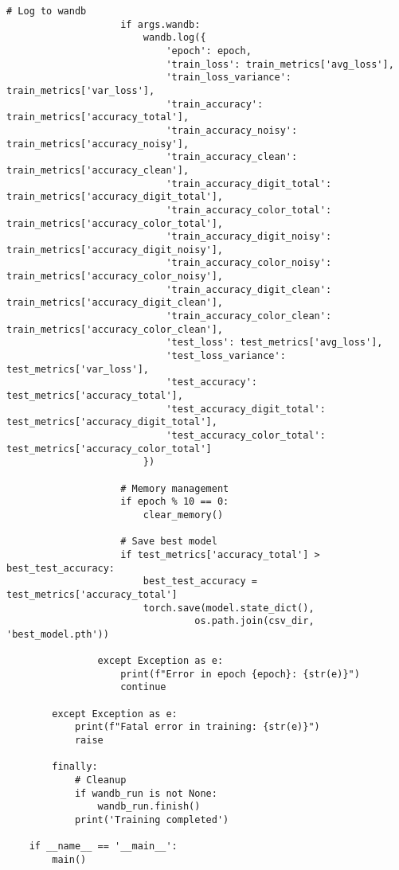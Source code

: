 \begin{lstlisting}[style=pythonstyle, caption={Program Example}]
                    # Log to wandb
                    if args.wandb:
                        wandb.log({
                            'epoch': epoch,
                            'train_loss': train_metrics['avg_loss'],
                            'train_loss_variance': train_metrics['var_loss'],
                            'train_accuracy': train_metrics['accuracy_total'],
                            'train_accuracy_noisy': train_metrics['accuracy_noisy'],
                            'train_accuracy_clean': train_metrics['accuracy_clean'],
                            'train_accuracy_digit_total': train_metrics['accuracy_digit_total'],
                            'train_accuracy_color_total': train_metrics['accuracy_color_total'],
                            'train_accuracy_digit_noisy': train_metrics['accuracy_digit_noisy'],
                            'train_accuracy_color_noisy': train_metrics['accuracy_color_noisy'],
                            'train_accuracy_digit_clean': train_metrics['accuracy_digit_clean'],
                            'train_accuracy_color_clean': train_metrics['accuracy_color_clean'],
                            'test_loss': test_metrics['avg_loss'],
                            'test_loss_variance': test_metrics['var_loss'],
                            'test_accuracy': test_metrics['accuracy_total'],
                            'test_accuracy_digit_total': test_metrics['accuracy_digit_total'],
                            'test_accuracy_color_total': test_metrics['accuracy_color_total']
                        })
    
                    # Memory management
                    if epoch % 10 == 0:
                        clear_memory()
    
                    # Save best model
                    if test_metrics['accuracy_total'] > best_test_accuracy:
                        best_test_accuracy = test_metrics['accuracy_total']
                        torch.save(model.state_dict(), 
                                 os.path.join(csv_dir, 'best_model.pth'))
    
                except Exception as e:
                    print(f"Error in epoch {epoch}: {str(e)}")
                    continue
    
        except Exception as e:
            print(f"Fatal error in training: {str(e)}")
            raise
        
        finally:
            # Cleanup
            if wandb_run is not None:
                wandb_run.finish()
            print('Training completed')
    
    if __name__ == '__main__':
        main()
\end{lstlisting}

